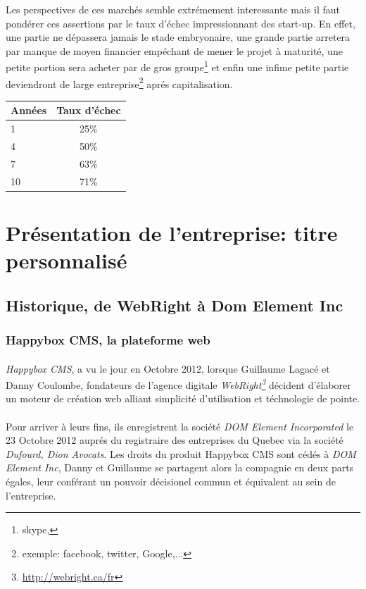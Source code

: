 \documentclass[11pt, a4paper ]{report}
\begin{document}
Les perspectives de ces marchés semble extrémement interessante mais il faut pondérer ces assertions par le taux d'échec impressionnant des start-up. En effet, une partie ne dépassera jamais le stade embryonaire, une grande partie arretera par manque de moyen financier empéchant de mener le projet à maturité, une petite portion sera acheter par de gros groupe\footnote{ skype, } et enfin une infime petite partie deviendront de large entreprise\footnote{exemple: facebook, twitter, Google,...} aprés capitalisation.
\begin{center}
\begin{tabular}{l*{1}{c}}
	Années  & Taux d'échec\\
	\hline
	1 & 25\% \\
	4 & 50\% \\
	7 & 63\% \\
	10 & 71\% \\
\end{tabular}\cite{statEchecStartup}
\end{center}

		\section{Présentation de l'entreprise: titre personnalisé} %
			\subsection{Historique, de WebRight à Dom Element Inc}
		\subsubsection{Happybox CMS, la plateforme web}
\paragraph{}
\emph{Happybox CMS}, a vu le jour en Octobre 2012, lorsque Guillaume Lagacé et Danny Coulombe, fondateurs de l'agence digitale \emph{WebRight\footnote{\url{http://webright.ca/fr}}} décident d'élaborer un moteur de création web alliant simplicité d'utilisation et téchnologie de pointe.
\paragraph{}
Pour arriver à leurs fins, ils enregistrent la société \emph{DOM Element Incorporated} le 23 Octobre 2012 auprés du registraire des entreprises du Quebec via la société \emph{Dufourd, Dion Avocats}. Les droits du produit Happybox CMS sont cédés à \emph{DOM Element Inc}, Danny et Guillaume se partagent alors la compagnie en deux parts égales, leur conférant un pouvoir décisionel commun et équivalent au sein de l'entreprise.
\end{document}
